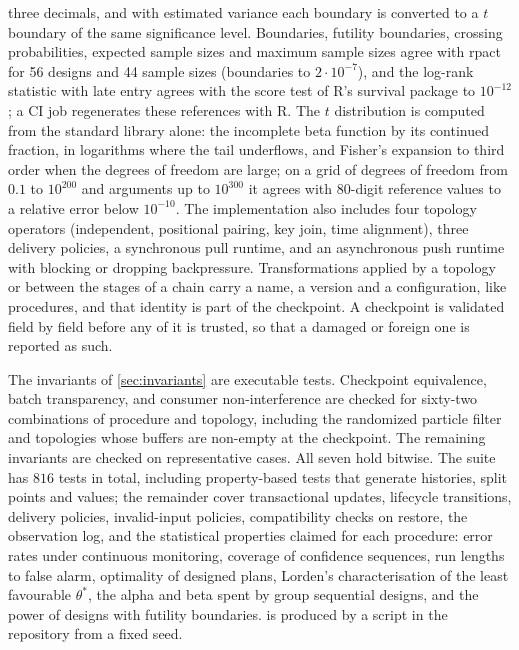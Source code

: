 \documentclass[11pt,a4paper]{article}
\theoremstyle{definition}
\theoremstyle{remark}
\begin{document}
three decimals, and with estimated variance each boundary is converted to
a $t$ boundary of the same significance level. Boundaries, futility
boundaries, crossing probabilities, expected sample sizes and maximum
sample sizes agree with rpact~\cite{rpact} for 56 designs and 44 sample
sizes (boundaries to $2\cdot10^{-7}$), and the log-rank statistic with
late entry agrees with the score test of R's survival package to
$10^{-12}$; a CI job regenerates these references with R. The $t$ distribution is
computed from the standard library alone: the incomplete beta function
by its continued fraction, in logarithms where the tail underflows, and
Fisher's expansion to third order when the degrees of freedom are
large; on a grid of degrees of freedom from $0.1$ to $10^{200}$ and
arguments up to $10^{300}$ it agrees with 80-digit reference values to
a relative error below $10^{-10}$. The
implementation also includes four topology operators (independent,
positional pairing, key join, time alignment), three delivery policies,
a synchronous pull runtime, and an asynchronous push runtime with
blocking or dropping backpressure. Transformations applied by a topology
or between the stages of a chain carry a name, a version and a
configuration, like procedures, and that identity is part of the
checkpoint. A checkpoint is validated field by field before any of it is
trusted, so that a damaged or foreign one is reported as such.

The invariants of \cref{sec:invariants} are executable tests.
Checkpoint equivalence, batch transparency, and consumer
non-interference are checked for sixty-two combinations of procedure and
topology, including the randomized particle filter and topologies whose
buffers are non-empty at the checkpoint. The remaining invariants are
checked on representative cases. All seven hold bitwise. The suite has
$816$ tests in total, including property-based tests that generate histories, split points and values; the remainder cover transactional updates,
lifecycle transitions, delivery policies, invalid-input policies,
compatibility checks on restore, the observation log, and the
statistical properties claimed for each procedure: error rates under
continuous monitoring, coverage of confidence sequences, run lengths to
false alarm, optimality of designed plans, Lorden's characterisation of
the least favourable $\theta^*$, the alpha and beta spent by group
sequential designs, and the power of designs with futility
boundaries.  is produced
by a script in the repository from a fixed seed.
\end{document}
